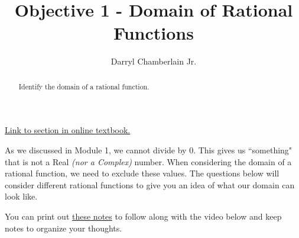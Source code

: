 \documentclass{ximera}
\author{Darryl Chamberlain Jr.}
\title{Objective 1 - Domain of Rational Functions}
\begin{document}
\begin{abstract}
Identify the domain of a rational function.
\end{abstract}
\maketitle

\href{https://cnx.org/contents/mwjClAV_@8.1:KNTP2r7D@13/Rational-Functions}{Link to section in online textbook.}


As we discussed in Module 1, we cannot divide by 0. This gives us ``something" that is not a Real \textit{(nor a Complex)} number. When considering the domain of a rational function, we need to exclude these values. The questions below will consider different rational functions to give you an idea of what our domain can look like. 

You can print out \href{http://people.clas.ufl.edu/dchamberlain31/files/M7-Objective-1-Domain-of-Rational-Functions.pdf}{these notes} to follow along with the video below and keep notes to organize your thoughts.

\end{document}
